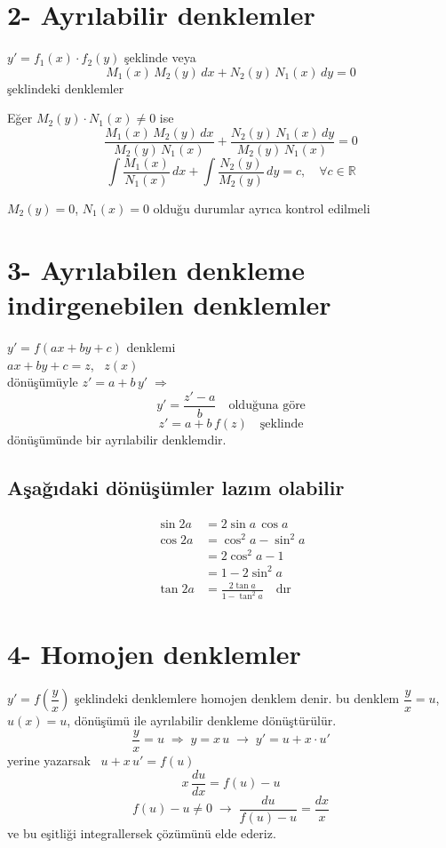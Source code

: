 \documentclass[11pt,a4paper]{article}
\begin{document}

\section{2- Ayrılabilir denklemler}

$y' = f_1(x)\cdot f_2(y)$ şeklinde veya
\[
  M_1(x)\,M_2(y)\,dx + N_2(y)\,N_1(x)\,dy = 0
\]
şeklindeki denklemler

Eğer $M_2(y)\cdot N_1(x) \ne 0$ ise
\[
  \frac{M_1(x)\,M_2(y)\,dx}{M_2(y)\,N_1(x)} + \frac{N_2(y)\,N_1(x)\,dy}{M_2(y)\,N_1(x)} = 0
\]
\[
  \int \frac{M_1(x)}{N_1(x)}\,dx + \int \frac{N_2(y)}{M_2(y)}\,dy = c, \quad \forall c\in\mathbb{R}
\]

$M_2(y) = 0$, $N_1(x) = 0$ olduğu durumlar ayrıca kontrol edilmeli

\section{3- Ayrılabilen denkleme indirgenebilen denklemler}

$y' = f(ax + by + c)$ denklemi\\
$ax + by + c = z$, \ $z(x)$\\
dönüşümüyle $z' = a + b\,y' \;\Rightarrow$
\[
  y' = \frac{z' - a}{b} \quad \text{olduğuna göre}
\]
\[
  z' = a + b\,f(z) \quad \text{şeklinde}
\]
dönüşümünde bir ayrılabilir denklemdir.

\subsection{Aşağıdaki dönüşümler lazım olabilir}
\begin{align*}
  \sin 2a &= 2\sin a\,\cos a\\
  \cos 2a &= \cos^2 a - \sin^2 a\\
          &= 2\cos^2 a - 1\\
          &= 1 - 2\sin^2 a\\[1mm]
  \tan 2a &= \frac{2\tan a}{1 - \tan^2 a} \quad \text{dır}
\end{align*}

\section{4- Homojen denklemler}

$y' = f\!\left(\dfrac{y}{x}\right)$ şeklindeki denklemlere homojen denklem denir.
bu denklem $\dfrac{y}{x} = u$, \ $u(x) = u$, dönüşümü ile ayrılabilir denkleme dönüştürülür.
\[
  \frac{y}{x} = u \;\Rightarrow\; y = x\,u \;\longrightarrow\; y' = u + x\cdot u'
\]
yerine yazarsak \ $u + x\,u' = f(u)$
\[
  x\,\frac{du}{dx} = f(u) - u
\]
\[
  f(u) - u \ne 0 \;\longrightarrow\; \frac{du}{f(u) - u} = \frac{dx}{x}
\]
ve bu eşitliği integrallersek çözümünü elde ederiz.
\end{document}
